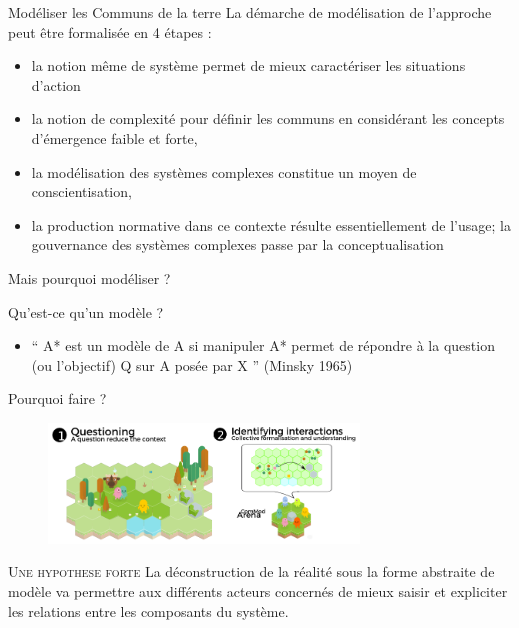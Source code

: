 \documentclass[newPxFont]{beamer}
\begin{document}
\begin{frame}[c]{Modéliser les Communs de la terre}
\vspace{-1cm}
La démarche de modélisation de l’approche peut être formalisée en 4 étapes :

\begin{itemize}
  \item la notion même de système permet de mieux caractériser les situations d’action
  \item la notion de complexité pour définir les communs en considérant les concepts d’émergence faible et forte,
  \item la modélisation des systèmes complexes constitue un moyen de conscientisation,
  \item la production normative dans ce contexte résulte essentiellement de l’usage; la gouvernance des systèmes complexes passe par la conceptualisation
\end{itemize}

\end{frame}

\begin{frame}[c]{Mais pourquoi modéliser ?}
\vspace{-1cm}

Qu'est-ce qu'un modèle ?
\begin{itemize}
  \item `` A* est un modèle de A si manipuler A* permet de répondre à la question (ou l'objectif) Q sur A posée par X '' (Minsky 1965)
\end{itemize}

Pourquoi faire ?
\vspace{-0.4cm}
\begin{figure}
  \includegraphics[height=3.2cm]{img/modeliser.png}
\end{figure}

\small{
  \begin{alertblock}{\textsc{Une hypothese forte}}
    La déconstruction de la réalité sous la forme abstraite de modèle va permettre aux différents acteurs concernés de mieux saisir et expliciter les relations entre les composants du système.
  \end{alertblock}
}
\end{frame}
\end{document}
